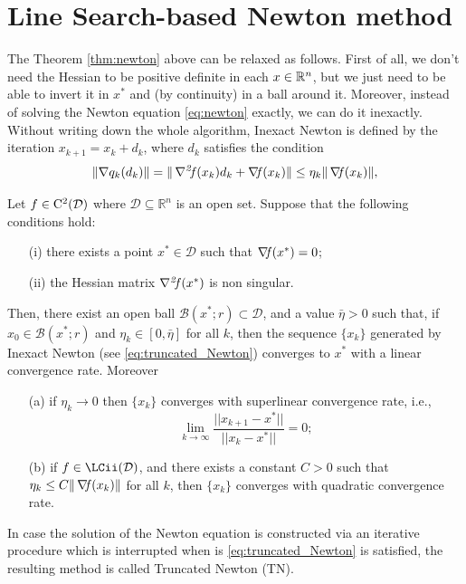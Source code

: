 \documentclass[10pt,a4paper]{article}
\begin{document}
\section{Line Search-based Newton method}
The Theorem \ref{thm:newton} above can be relaxed as follows. First of all, we don't need the Hessian to be positive definite in each $x\in \mathbb{R}^n$, but we just need to be able to invert it in $x^*$ and (by continuity) in a ball around it. Moreover, instead of solving the Newton equation \eqref{eq:newton} exactly, we can do it inexactly. Without writing down the whole algorithm, Inexact Newton is defined by the iteration $x_{k+1} = x_k + d_k$, where $d_k$ satisfies the condition
\begin{equation}\label{eq:truncated_Newton}
	\| \nabla q_k(d_k)\|=\|\operatorname*{\mathit{\nabla^2 \!f}}(x_k) d_k + \operatorname*{\mathit{\nabla \!f}}(x_k)\| \leq \eta_k \|\operatorname*{\mathit{\nabla \!f}}(x_k)\|,
\end{equation}
\begin{proposition}\label{inexact_newton}
	Let $f\in \mathord{\mathrm{C^2}}(\mathcal{D})$ where $\mathcal{D} \subseteq \mathbb{R}^n$ is an open set. Suppose that the following conditions hold:
	\begin{itemize}
		\item[(i)] there exists a point $x^* \in \mathcal{D}$ such that $\operatorname*{\mathit{\nabla \!f}}(x^*) = 0$;
		\item[(ii)] the Hessian matrix $\operatorname*{\mathit{\nabla^2 \!f}}(x^*)$ is non singular.
	\end{itemize}
	Then, there exist an open ball $\mathcal{B}(x^*; r) \subset \mathcal{D}$, and a value $\bar{\eta}>0$ such that, if $x_0 \in \mathcal{B}(x^*; r)$ and $\eta_k \in [0, \bar{\eta}]$ for all $k$, then the sequence $\{x_k\}$ generated by Inexact Newton (see \eqref{eq:truncated_Newton})	converges to $x^*$ with a linear convergence rate. Moreover 
	\begin{itemize}
		\item[(a)] if $\eta_k \to 0$ then $\{x_k\}$ converges with superlinear convergence rate, i.e., 
		$$ \lim_{k\to \infty} \frac{||x_{k+1}-x^*||}{||x_k-x^*||}=0;$$
		\item[(b)] if $f\in \LCii(\mathcal{D})$, and there exists a constant $C > 0$ such that $\eta_k \leq C \|\operatorname*{\mathit{\nabla \!f}}(x_k)\|$ for all $k$, then $\{x_k\}$ converges with quadratic convergence rate.
	\end{itemize}
\end{proposition}

\noindent In case the solution of the Newton equation is constructed via an iterative procedure which is  interrupted when is \eqref{eq:truncated_Newton} is satisfied, the resulting method is called Truncated Newton (TN).
\end{document}
